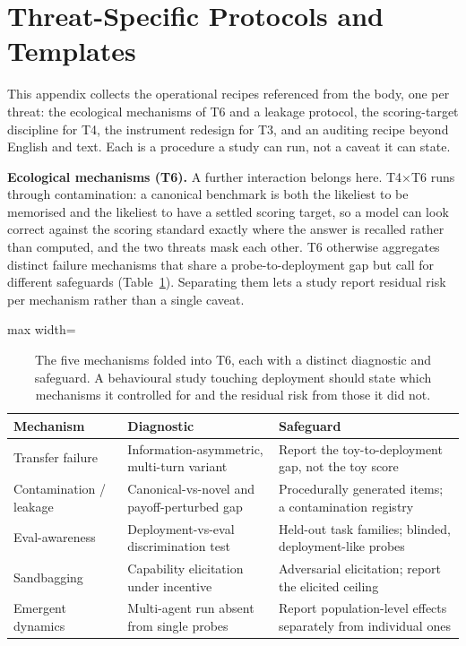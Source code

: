 \documentclass[11pt]{article}
\begin{document}
\section{Threat-Specific Protocols and Templates}
\label{app:t6mech}

This appendix collects the operational recipes referenced from the body, one per
threat: the ecological mechanisms of T6 and a leakage protocol, the scoring-target
discipline for T4, the instrument redesign for T3, and an auditing recipe beyond
English and text. Each is a procedure a study can run, not a caveat it can state.

\textbf{Ecological mechanisms (T6).} A further interaction belongs here.
T4$\times$T6 runs through contamination: a canonical benchmark is both the
likeliest to be memorised and the likeliest to have a settled scoring target, so
a model can look correct against the scoring standard exactly where the answer is
recalled rather than computed, and the two threats mask each other. T6 otherwise
aggregates distinct failure mechanisms that share a probe-to-deployment gap but
call for different safeguards (Table~\ref{tab:t6mech}). Separating them lets a
study report residual risk per mechanism rather than a single caveat.

\begin{table}[H]
\centering
\footnotesize
\setlength{\tabcolsep}{3pt}
\renewcommand{\arraystretch}{1.18}
\begin{adjustbox}{max width=\columnwidth}
\begin{tabular}{@{}>{\raggedright\arraybackslash}p{1.9cm}>{\raggedright\arraybackslash}p{2.6cm}>{\raggedright\arraybackslash}p{2.5cm}@{}}
\toprule
\textbf{Mechanism} & \textbf{Diagnostic} & \textbf{Safeguard} \\
\midrule
Transfer failure & Information-asymmetric, multi-turn variant \cite{liu2024autonomous} & Report the toy-to-deployment gap, not the toy score \\
Contamination / leakage & Canonical-vs-novel and payoff-perturbed gap \cite{tewolde2026coopeval,sainz2023nlp} & Procedurally generated items; a contamination registry \\
Eval-awareness & Deployment-vs-eval discrimination test \cite{needham2025evalaware} & Held-out task families; blinded, deployment-like probes \\
Sandbagging & Capability elicitation under incentive \cite{vanderweij2025sandbagging} & Adversarial elicitation; report the elicited ceiling \\
Emergent dynamics & Multi-agent run absent from single probes \cite{park2023generative,ashery2025emergent} & Report population-level effects separately from individual ones \\
\bottomrule
\end{tabular}
\end{adjustbox}
\caption{The five mechanisms folded into T6, each with a distinct diagnostic and
safeguard. A behavioural study touching deployment should state which mechanisms
it controlled for and the residual risk from those it did not.}
\label{tab:t6mech}
\end{table}
\end{document}
